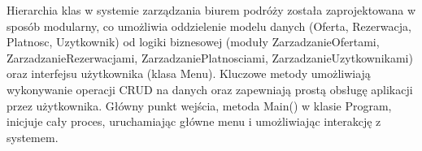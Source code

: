 Hierarchia klas w systemie zarządzania biurem podróży została zaprojektowana w sposób modularny, co umożliwia oddzielenie modelu danych (Oferta, Rezerwacja, Platnosc, Uzytkownik) od logiki biznesowej (moduły ZarzadzanieOfertami, ZarzadzanieRezerwacjami, ZarzadzaniePlatnosciami, ZarzadzanieUzytkownikami) oraz interfejsu użytkownika (klasa Menu). Kluczowe metody umożliwiają wykonywanie operacji CRUD na danych oraz zapewniają prostą obsługę aplikacji przez użytkownika. Główny punkt wejścia, metoda Main() w klasie Program, inicjuje cały proces, uruchamiając główne menu i umożliwiając interakcję z systemem.

